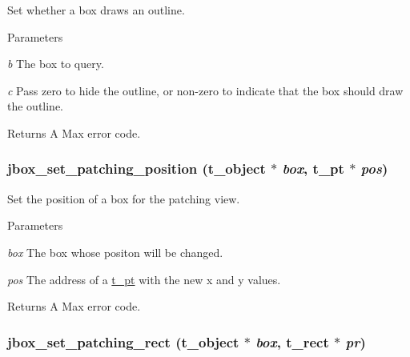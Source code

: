 Set whether a box draws an outline. 
\begin{DoxyParams}{Parameters}
\item[{\em b}]The box to query. \item[{\em c}]Pass zero to hide the outline, or non-\/zero to indicate that the box should draw the outline. \end{DoxyParams}
\begin{DoxyReturn}{Returns}
A Max error code. 
\end{DoxyReturn}
\hypertarget{group__jbox_gac4baff3db6cac220f46e73a3f6986ac9}{
\subsubsection[{jbox\_\-set\_\-patching\_\-position}]{ jbox\_\-set\_\-patching\_\-position ({\bf t\_\-object} $\ast$ {\em box}, \/  {\bf t\_\-pt} $\ast$ {\em pos})}}
\label{group__jbox_gac4baff3db6cac220f46e73a3f6986ac9}


Set the position of a box for the patching view. 
\begin{DoxyParams}{Parameters}
\item[{\em box}]The box whose positon will be changed. \item[{\em pos}]The address of a \hyperlink{structt__pt}{t\_\-pt} with the new x and y values. \end{DoxyParams}
\begin{DoxyReturn}{Returns}
A Max error code. 
\end{DoxyReturn}
\hypertarget{group__jbox_gab9c38504ceb26b0674eba0ee31ff776b}{
\subsubsection[{jbox\_\-set\_\-patching\_\-rect}]{ jbox\_\-set\_\-patching\_\-rect ({\bf t\_\-object} $\ast$ {\em box}, \/  {\bf t\_\-rect} $\ast$ {\em pr})}}
\label{group__jbox_gab9c38504ceb26b0674eba0ee31ff776b}


